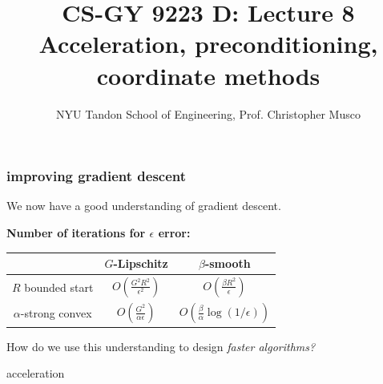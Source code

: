 \documentclass[compress]{beamer}
\title{CS-GY 9223 D: Lecture 8 \\ Acceleration, preconditioning, coordinate methods}
\author{NYU Tandon School of Engineering, Prof. Christopher Musco}
\date{}
\begin{document}
\begin{frame}
	\titlepage 
\end{frame}

\begin{frame}
	\frametitle{improving gradient descent}
	We now have a good understanding of gradient descent. 
	
	\textbf{Number of iterations for $\epsilon$ error:}
	\begin{center}
		\begin{tabular}{c|cc}
			& $G$-Lipschitz & $\beta$-smooth   \\ \hline
			$R$ bounded start & $O\left(\frac{G^2R^2}{\epsilon^2}\right)$ & $O\left(\frac{\beta R^2}{\epsilon}\right)$ \\
			$\alpha$-strong convex & $O\left(\frac{G^2}{\alpha\epsilon}\right)$ & $O\left(\frac{\beta}{\alpha}\log(1/\epsilon)\right)$
		\end{tabular}
	\end{center}
	
	\vspace{1em}
	\alert{How do we use this understanding to design \emph{faster algorithms?}}
\end{frame}

\begin{frame}[standout]
	\begin{center}
		\large acceleration
	\end{center}
\end{frame}
\end{document}

